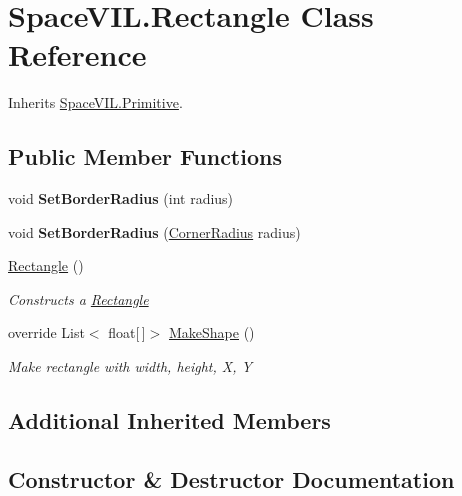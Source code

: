 \hypertarget{class_space_v_i_l_1_1_rectangle}{}\section{Space\+V\+I\+L.\+Rectangle Class Reference}
\label{class_space_v_i_l_1_1_rectangle}


Inherits \mbox{\hyperlink{class_space_v_i_l_1_1_primitive}{Space\+V\+I\+L.\+Primitive}}.

\subsection*{Public Member Functions}
\begin{DoxyCompactItemize}
\item 
\mbox{\label{class_space_v_i_l_1_1_rectangle_ad07338f6cc154dfecd52971c44fcba17}} 
void {\bfseries Set\+Border\+Radius} (int radius)
\item 
\mbox{\label{class_space_v_i_l_1_1_rectangle_a99f6f1b16cc35215ae5edc166e256cde}} 
void {\bfseries Set\+Border\+Radius} (\mbox{\hyperlink{class_space_v_i_l_1_1_decorations_1_1_corner_radius}{Corner\+Radius}} radius)
\item 
\mbox{\hyperlink{class_space_v_i_l_1_1_rectangle_af59c31fe554514fabe70d2f1e97cf9d4}{Rectangle}} ()
\begin{DoxyCompactList}\small\item\em Constructs a \mbox{\hyperlink{class_space_v_i_l_1_1_rectangle}{Rectangle}} \end{DoxyCompactList}\item 
override List$<$ float\mbox{[}$\,$\mbox{]}$>$ \mbox{\hyperlink{class_space_v_i_l_1_1_rectangle_acc0a5018e266efaa750459bb875eb805}{Make\+Shape}} ()
\begin{DoxyCompactList}\small\item\em Make rectangle with width, height, X, Y \end{DoxyCompactList}\end{DoxyCompactItemize}
\subsection*{Additional Inherited Members}


\subsection{Constructor \& Destructor Documentation}
\mbox{\label{class_space_v_i_l_1_1_rectangle_af59c31fe554514fabe70d2f1e97cf9d4}} 
